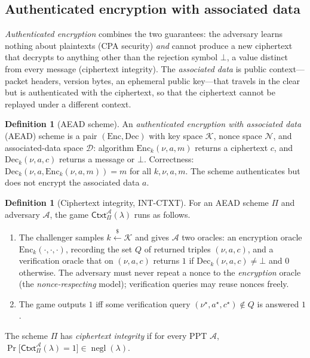 \documentclass[11pt,a4paper]{article}
\theoremstyle{definition}
\newtheorem{definition}[theorem]{Definition}
\theoremstyle{remark}
\DeclareMathOperator{\negl}{negl}
\begin{document}
\subsection{Authenticated encryption with associated data}
\label{symmetric:subsec:aead}

\emph{Authenticated encryption} combines the two guarantees: the
adversary learns nothing about plaintexts (CPA security) \emph{and}
cannot produce a new ciphertext that decrypts to anything other than
the rejection symbol \(\bot\), a value distinct from every message
(ciphertext integrity). The \emph{associated data} is public
context---packet headers, version bytes, an ephemeral public key---that
travels in the clear but is authenticated with the ciphertext, so that
the ciphertext cannot be replayed under a different context.

\begin{definition}[AEAD scheme]\label{symmetric:def-aead}
An \emph{authenticated encryption with associated data} (AEAD)
scheme is a pair \((\mathrm{Enc}, \mathrm{Dec})\) with key space
\(\mathcal{K}\), nonce space \(\mathcal{N}\), and associated-data
space \(\mathcal{D}\): algorithm \(\mathrm{Enc}_{k}(\nu, a, m)\)
returns a ciphertext \(c\), and \(\mathrm{Dec}_{k}(\nu, a, c)\)
returns a message or \(\bot\). Correctness:
\(\mathrm{Dec}_{k}(\nu, a, \mathrm{Enc}_{k}(\nu, a, m)) = m\) for all
\(k, \nu, a, m\). The scheme authenticates but does not encrypt the
associated data \(a\).
\end{definition}

\begin{definition}[Ciphertext integrity, INT-CTXT]
\label{symmetric:def-intctxt}
For an AEAD scheme \(\Pi\) and adversary \(\mathcal{A}\), the game
\(\mathsf{Ctxt}^{\mathcal{A}}_{\Pi}(\lambda)\) runs as follows.
\begin{enumerate}
\item The challenger samples \(k \xleftarrow{\$} \mathcal{K}\)
  and gives \(\mathcal{A}\) two oracles: an encryption oracle
  \(\mathrm{Enc}_{k}(\cdot, \cdot, \cdot)\), recording the set \(Q\)
  of returned triples \((\nu, a, c)\), and a verification oracle
  that on \((\nu, a, c)\) returns \(1\) if
  \(\mathrm{Dec}_{k}(\nu, a, c) \ne \bot\) and \(0\) otherwise. The
  adversary must never repeat a nonce to the \emph{encryption}
  oracle (the \emph{nonce-respecting} model); verification queries
  may reuse nonces freely.
\item The game outputs \(1\) iff some verification query
  \((\nu^{\star}, a^{\star}, c^{\star}) \notin Q\) is answered
  \(1\).
\end{enumerate}
The scheme \(\Pi\) has \emph{ciphertext integrity} if for every PPT
\(\mathcal{A}\),
\(\Pr\bigl[\mathsf{Ctxt}^{\mathcal{A}}_{\Pi}(\lambda) = 1\bigr]
\in \negl(\lambda)\).
\end{definition}
\end{document}
